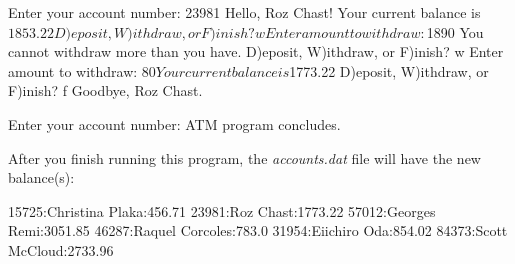 \begin{exercise}
\begin{stdout}
Enter your account number: 23981
Hello, Roz Chast!
Your current balance is $1853.22
D)eposit, W)ithdraw, or F)inish? w
Enter amount to withdraw: $1890
You cannot withdraw more than you have.
D)eposit, W)ithdraw, or F)inish? w
Enter amount to withdraw: $80
Your current balance is $1773.22
D)eposit, W)ithdraw, or F)inish? f
Goodbye, Roz Chast.

Enter your account number:
ATM program concludes.
\end{stdout}

After you finish running this program, the {\em accounts.dat} file will have the new balance(s):

\begin{stdout}
15725:Christina Plaka:456.71
23981:Roz Chast:1773.22
57012:Georges Remi:3051.85
46287:Raquel Corcoles:783.0
31954:Eiichiro Oda:854.02
84373:Scott McCloud:2733.96
\end{stdout}

\end{exercise}
